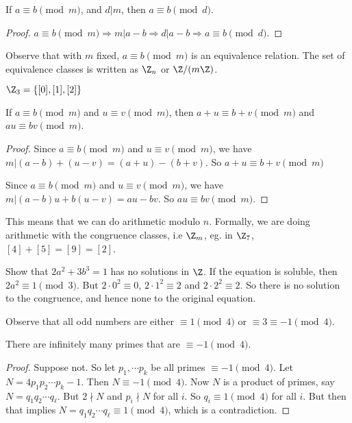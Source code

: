 \documentclass[a4paper]{article}
\begin{document}
  \begin{prop}
    If $a\equiv b\pmod m$, and $d | m$, then $a \equiv b\pmod d$.
  \end{prop}

  \begin{proof}
    $a\equiv b\pmod m \Rightarrow m | a - b \Rightarrow d | a - b \Rightarrow a \equiv b\pmod d$.
  \end{proof}

  Observe that with $m$ fixed, $a\equiv b\pmod m$ is an equivalence relation. The set of equivalence classes is written as $\Z_n$ or $\Z/(m\Z)$.

  \begin{eg}
    $\Z_3 = \{[0], [1], [2]\}$
  \end{eg}

  \begin{prop}
    If $a\equiv b\pmod m$ and $u\equiv v \pmod m$, then $a + u\equiv b + v\pmod m$ and $au \equiv bv \pmod m$.
  \end{prop}

  \begin{proof}
    Since $a\equiv b\pmod m$ and $u\equiv v \pmod m$, we have $m | (a - b) + (u - v) = (a + u) - (b + v)$. So $a + u\equiv b + v\pmod m$

    Since $a\equiv b\pmod m$ and $u\equiv v \pmod m$, we have $m | (a - b)u + b(u - v) = au - bv$. So $au \equiv bv \pmod m$.
  \end{proof}

  This means that we can do arithmetic modulo $n$. Formally, we are doing arithmetic with the congruence classes, i.e $\Z_m$, eg. in $\Z_7$, $[4] + [5] = [9] = [2]$.

  \begin{eg}
    Show that $2a^2  + 3b^3 = 1$ has no solutions in $\Z$. If the equation is soluble, then $2a^2 \equiv 1\pmod 3$. But $2\cdot 0^2 \equiv 0$, $2\cdot 1^2\equiv 2$ and $2\cdot 2^2 \equiv 2$. So there is no solution to the congruence, and hence none to the original equation.
  \end{eg}

  Observe that all odd numbers are either $\equiv 1\pmod 4$ or $\equiv 3\equiv -1\pmod 4$.

  \begin{thm}
    There are infinitely many primes that are $\equiv -1 \pmod 4$.
  \end{thm}

  \begin{proof}
    Suppose not. So let $p_1, \cdots p_k$ be all primes $\equiv -1 \pmod 4$. Let $N = 4p_1p_2\cdots p_k - 1$. Then $N\equiv -1\pmod 4$. Now $N$ is a product of primes, say $N= q_1q_2\cdots q_\ell$. But $2\nmid N$ and $p_i\nmid N$ for all $i$. So $q_i \equiv 1\pmod 4$ for all $i$. But then that implies $N = q_1q_2\cdots q_\ell \equiv 1\pmod 4$, which is a contradiction.
  \end{proof}
\end{document}
